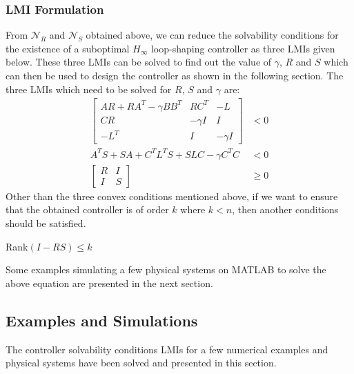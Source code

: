 \documentclass[a4paper,12pt]{article}
\begin{document}
	 	 	\subsubsection{LMI Formulation}
	 	From $\mathscr{N}_{R}$ and $\mathscr{N}_{S}$ obtained above, we can reduce the solvability conditions for the existence of a suboptimal $H_{\infty}$ loop-shaping controller as three LMIs given below. These three LMIs can be solved to find out the value of $\gamma$, $R$ and $S$ which can then be used to design the controller as shown in the following section. The three LMIs which need to be solved for $R$, $S$ and $\gamma$ are:
	 	\begin{align}
	 	\begin{bmatrix}
	 	AR + RA^{T} - \gamma BB^{T} & RC^{T} & -L\\
	 	CR & -\gamma I & I \\
	 	-L^{T} & I & -\gamma I 
	 	\end{bmatrix} &< 0 \\
	 	A^{T}S + SA + C^{T}L^{T}S + SLC - \gamma C^{T}C &< 0 \\
	 	\begin{bmatrix}
	 	R & I \\
	 	I & S
	 	\end{bmatrix} &\geq 0
	 	\end{align}
	 	Other than the three convex conditions mentioned above, if we want to ensure that the obtained controller is of order $k$ where $k<n$, then another conditions should be satisfied.
	 	\begin{center} Rank$(I-RS) \leq k$ \end{center}
	 	Some examples simulating a few physical systems on MATLAB to solve the above equation are presented in the next section.
	 	\subsection{Examples and Simulations}
	 	The controller solvability conditions LMIs for a few numerical examples and physical systems have been solved and presented in this section. 
\end{document}
